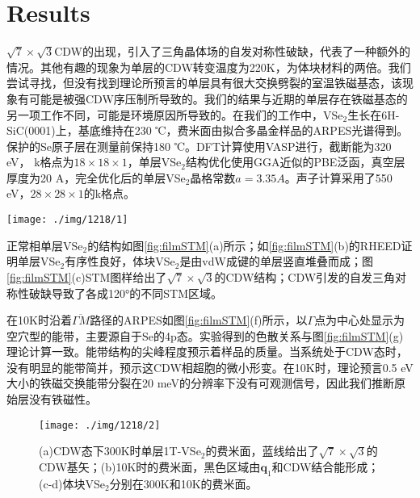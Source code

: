 \documentclass[reprint, aps, prb, showkeys]{revtex4-2}
\begin{document}
\section{Results}
$\sqrt{7} \times \sqrt{3}$CDW的出现，引入了三角晶体场的自发对称性破缺，代表了一种额外的情况。其他有趣的现象为单层的CDW转变温度为220K，为体块材料的两倍。我们尝试寻找，但没有找到理论所预言的单层具有很大交换劈裂的室温铁磁基态，该现象有可能是被强CDW序压制所导致的。我们的结果与近期的单层存在铁磁基态的另一项工作不同，可能是环境原因所导致的。在我们的工作中，VSe$_2$生长在6H-SiC(0001)上，基底维持在230 ℃，费米面由拟合多晶金样品的ARPES光谱得到。保护的Se原子层在测量前保持180 ℃。DFT计算使用VASP进行，截断能为320 eV， k格点为$18 \times 18 \times 1$，单层VSe$_2$结构优化使用GGA近似的PBE泛函，真空层厚度为20 A，完全优化后的单层VSe$_2$晶格常数$a = 3.35 A$。声子计算采用了550 eV，$28 \times 28 \times 1$的k格点。
\begin{figure*}[t]
    \texttt{[image: ./img/1218/1]}
    \caption{\label{fig:filmSTM} 
    (a)1T-VSe$_2$的晶格结构；(b)室温下单层生长的RHEED图样；(c)77K时$\sqrt{7} \times \sqrt{3}$CDW的STM图；(d)图(c)的傅里叶变换；(e)蓝色($1 \times 1$)和红色($\sqrt{7} \times \sqrt{3}$)的布里渊区，$\boldsymbol{q}_1、\boldsymbol{q}_2$是对应的倒格矢；(f)在10K时沿着$\overline{\Gamma M}$路径的ARPES图像。(g)不含自旋极化原胞计算的色散关系。
    }
\end{figure*}

正常相单层VSe$_2$的结构如图\ref{fig:filmSTM}(a)所示；如\ref{fig:filmSTM}(b)的RHEED证明单层VSe$_2$有序性良好，体块VSe$_2$是由vdW成键的单层竖直堆叠而成；图\ref{fig:filmSTM}(c)STM图样给出了$\sqrt{7} \times \sqrt{3}$的CDW结构；CDW引发的自发三角对称性破缺导致了各成120°的不同STM区域。

在10K时沿着$\overline{\Gamma M}$路径的ARPES如图\ref{fig:filmSTM}(f)所示，以$\Gamma$点为中心处显示为空穴型的能带，主要源自于Se的4p态。实验得到的色散关系与图\ref{fig:filmSTM}(g)理论计算一致。能带结构的尖峰程度预示着样品的质量。当系统处于CDW态时，没有明显的能带简并，预示这CDW相超胞的微小形变。在10K时，理论预言0.5 eV大小的铁磁交换能带分裂在20 meV的分辨率下没有可观测信号，因此我们推断原始层没有铁磁性。
\begin{figure}[b]
    \texttt{[image: ./img/1218/2]}
    \caption{\label{fig:fermi} 
    (a)CDW态下300K时单层1T-VSe$_2$的费米面，蓝线给出了$\sqrt{7} \times \sqrt{3}$的CDW基矢；(b)10K时的费米面，黑色区域由$\boldsymbol{q}_1$和CDW结合能形成；(c-d)体块VSe$_2$分别在300K和10K的费米面。
    }
\end{figure}
\end{document}
